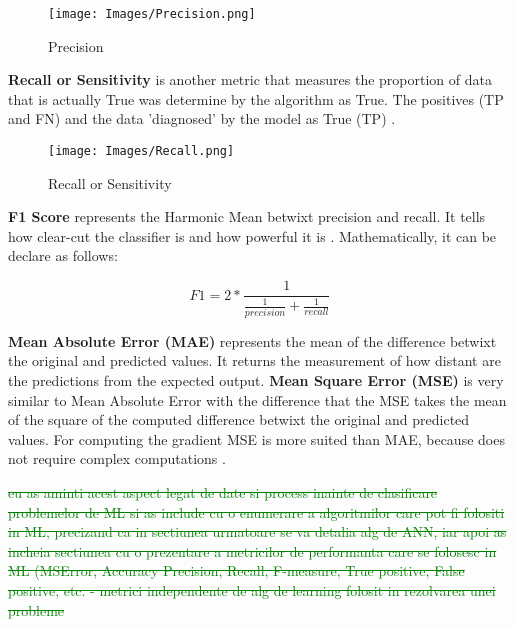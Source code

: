 \begin{figure}[h!]
    \centering
    \texttt{[image: Images/Precision.png]}
    \caption{Precision \cite{Metrics}}
    \label{fig:Precision}
\end{figure}

\textbf{Recall or Sensitivity} is another metric that measures the proportion of data that is actually True was determine by the algorithm as True. The positives (TP and FN) and the data 'diagnosed' by the model as True (TP) \cite{Metrics}.

\begin{figure}[h!]
    \centering
    \texttt{[image: Images/Recall.png]}
    \caption{Recall or Sensitivity \cite{Metrics}}
    \label{fig:Recall}
\end{figure}

\textbf{F1 Score} represents the Harmonic Mean betwixt precision and recall. It tells how clear-cut the classifier is and how powerful it is \cite{Evaluate}. Mathematically, it can be declare as follows:

\begin{center}
    \begin{equation}
        F1 =2 * \frac{1}{\frac{1}{precision} + \frac{1}{recall}}
    \end{equation}
\end{center}

\textbf{Mean Absolute Error (MAE)} represents the mean of the difference betwixt the original and predicted values. It returns the measurement of how distant are the predictions from the expected output. \textbf{Mean Square Error (MSE)} is very similar to Mean Absolute Error with the difference that the MSE takes the mean of the square of the computed difference betwixt the original and predicted values. For computing the gradient MSE is more suited than MAE, because does not require complex computations \cite{Evaluate}.

\textcolor{green}{\sout{eu as aminti acest aspect legat de date si process inainte de clasificare problemelor de ML si as include cu o enumerare a algoritmilor care pot fi folositi in ML, precizand ca in sectiunea urmatoare se va detalia alg de ANN, iar apoi as incheia sectiunea cu o prezentare a metricilor de performanta care se folosesc in ML (MSError, Accuracy Precision, Recall, F-measure, True positive, False positive, etc. - metrici independente de alg de learning folosit in rezolvarea unei probleme}}
